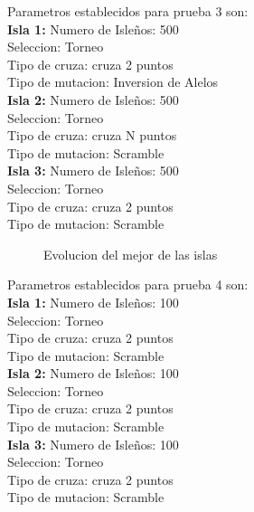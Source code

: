 \documentclass[10pt,letterpaper]{article}
\begin{document}
Parametros establecidos para prueba 3 son:
\\
\textbf{Isla 1:} Numero de Isleños: 500\\
Seleccion: Torneo\\ 
Tipo de cruza: cruza 2 puntos\\
Tipo de mutacion: Inversion de Alelos\\
\textbf{Isla 2:} Numero de Isleños: 500\\
Seleccion: Torneo\\ 
Tipo de cruza: cruza N puntos\\
Tipo de mutacion: Scramble\\
\textbf{Isla 3:} Numero de Isleños: 500\\
Seleccion: Torneo\\ 
Tipo de cruza: cruza 2 puntos\\
Tipo de mutacion: Scramble

\begin{figure}[H]
      \begin{center}
        \caption{Evolucion del mejor de las islas}
        \label{Patron de señales para reconocimiento de señal Gaussiana}
      \end{center}
    \end{figure}

Parametros establecidos para prueba 4 son:
\\
\textbf{Isla 1:} Numero de Isleños: 100\\
Seleccion: Torneo\\ 
Tipo de cruza: cruza 2 puntos\\
Tipo de mutacion: Scramble\\
\textbf{Isla 2:} Numero de Isleños: 100\\
Seleccion: Torneo\\ 
Tipo de cruza: cruza 2 puntos\\
Tipo de mutacion: Scramble\\
\textbf{Isla 3:} Numero de Isleños: 100\\
Seleccion: Torneo\\ 
Tipo de cruza: cruza 2 puntos\\
Tipo de mutacion: Scramble
\end{document}
